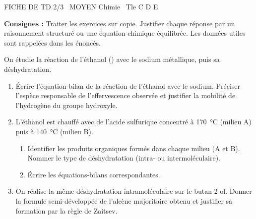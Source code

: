 \documentclass[11pt]{article}
\begin{document}
\begin{tcolorbox}[enhanced,colback=popink,colframe=popink,arc=10pt,boxrule=0pt,left=12pt,right=12pt,top=9pt,bottom=9pt]
{\color{white}\popxbold\small FICHE DE TD 2/3 \textbullet\ MOYEN \hfill Chimie \textbullet\ Tle C D E\par}
\end{tcolorbox}
\vspace{4pt}
\noindent \textbf{Consignes :} Traiter les exercices sur copie. Justifier chaque réponse par un raisonnement structuré ou une équation chimique équilibrée. Les données utiles sont rappelées dans les énoncés.

\begin{exercice}
On étudie la réaction de l'éthanol () avec le sodium métallique, puis sa déshydratation.
\begin{enumerate}
    \item Écrire l'équation-bilan de la réaction de l'éthanol avec le sodium. Préciser l'espèce responsable de l'effervescence observée et justifier la mobilité de l'hydrogène du groupe hydroxyle.
    \item L'éthanol est chauffé avec de l'acide sulfurique concentré à \SI{170}{\celsius} (milieu A) puis à \SI{140}{\celsius} (milieu B).
    \begin{enumerate}
        \item Identifier les produits organiques formés dans chaque milieu (A et B). Nommer le type de déshydratation (intra- ou intermoléculaire).
        \item Écrire les équations-bilans correspondantes.
    \end{enumerate}
    \item On réalise la même déshydratation intramoléculaire sur le butan-2-ol. Donner la formule semi-développée de l'alcène majoritaire obtenu et justifier sa formation par la règle de Zaitsev.
\end{enumerate}
\end{exercice}
\end{document}
